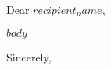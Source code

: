 \documentclass[11pt]{letter}
\makeatletter
\renewcommand{\closing}[1]{%
  \par\nobreak\vspace{\parskip}%
  \stopbreaks%
  \noindent%
  #1,\\[2\parskip]%
  \ifx\@empty\fromsig\else \fromsig\fi\par}
\makeatother
\begin{document}
\begin{letter}{}

\date{$date$}
\opening{Dear $recipient_name$,}

$body$

\closing{Sincerely}

\end{letter}
\end{document}
